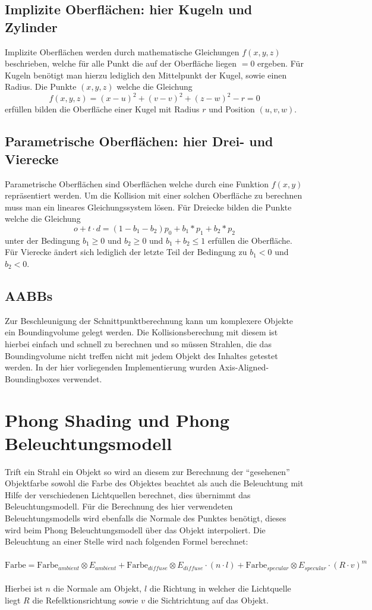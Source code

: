 \documentclass[a4paper]{article}
\begin{document}
\subsection*{Implizite Oberflächen: hier Kugeln und Zylinder}
Implizite Oberflächen werden durch mathematische Gleichungen $f(x,y,z)$ beschrieben, welche für alle Punkt die auf der Oberfläche liegen $= 0$ ergeben. Für Kugeln benötigt man hierzu lediglich den Mittelpunkt der Kugel, sowie einen Radius. Die Punkte $(x,y,z)$ welche die Gleichung
\[f(x,y,z) = (x-u)^2 + (v-v)^2 + (z-w)^2 - r = 0\]
erfüllen bilden die Oberfläche einer Kugel mit Radius $r$ und Position $(u,v,w)$.

\subsection*{Parametrische Oberflächen: hier Drei- und Vierecke}
Parametrische Oberflächen sind Oberflächen welche durch eine Funktion $f(x,y)$ repräsentiert werden. Um die Kollision mit einer solchen Oberfläche zu berechnen muss man ein lineares Gleichungssystem lösen. Für Dreiecke bilden die Punkte welche die Gleichung
\[o+t\cdot d = (1 - b_1 - b_2)p_0 + b_1*p_1 + b_2*p_2\]
unter der Bedingung $b_1 \geq 0$ und $b_2 \geq 0$ und $b_1 + b_2 \leq 1$ erfüllen die Oberfläche. Für Vierecke ändert sich lediglich der letzte Teil der Bedingung zu $b_1 < 0$ und $b_2 < 0$.

\subsection*{AABBs}
Zur Beschleunigung der Schnittpunktberechnung kann um komplexere Objekte ein Boundingvolume gelegt werden. Die Kollisionsberechung mit diesem ist hierbei einfach und schnell zu berechnen und so müssen Strahlen, die das Boundingvolume nicht treffen nicht mit jedem Objekt des Inhaltes getestet werden. In der hier vorliegenden Implementierung wurden Axis-Aligned-Boundingboxes verwendet.

\section*{Phong Shading und Phong Beleuchtungsmodell}
Trift ein Strahl ein Objekt so wird an diesem zur Berechnung der "`gesehenen"' Objektfarbe sowohl die Farbe des Objektes beachtet als auch die Beleuchtung mit Hilfe der verschiedenen Lichtquellen berechnet, dies übernimmt das Beleuchtungsmodell. Für die Berechnung des hier verwendeten Beleuchtungsmodells wird ebenfalls die Normale des Punktes benötigt, dieses wird beim Phong Beleuchtungsmodell über das Objekt interpoliert. Die Beleuchtung an einer Stelle wird nach folgenden Formel berechnet:\\
\\$\mbox{Farbe} = \mbox{Farbe}_{ambient} \otimes E_{ambient} + \mbox{Farbe}_{diffuse} \otimes E_{diffuse} \cdot (n \cdot l) + \mbox{Farbe}_{specular} \otimes E_{specular} \cdot (R \cdot v)^m$\\\\
Hierbei ist $n$ die Normale am Objekt, $l$ die Richtung in welcher die Lichtquelle liegt $R$ die Refelktionsrichtung sowie $v$ die Sichtrichtung auf das Objekt.
\end{document}
